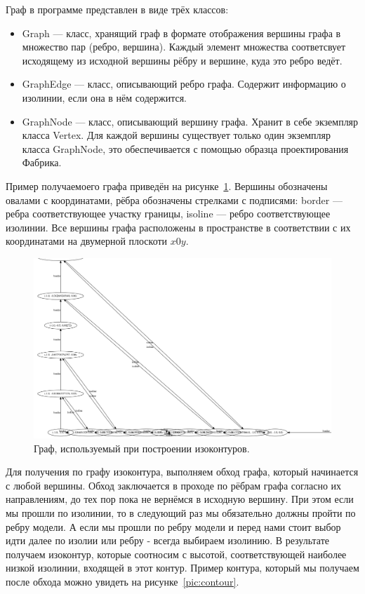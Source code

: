 \documentclass[12pt,a4paper,oneside]{extarticle}
\begin{document}
        Граф в программе представлен в виде трёх классов:
        \begin{itemize}
            \item Graph --- класс, хранящий граф в формате отображения вершины графа в множество пар (ребро, вершина). Каждый элемент множества соответсвует исходящему из исходной вершины рёбру и вершине, куда это ребро ведёт.
            \item GraphEdge --- класс, описывающий ребро графа. Содержит информацию о изолинии, если она в нём содержится.
            \item GraphNode --- класс, описывающий вершину графа. Хранит в себе экземпляр класса Vertex. Для каждой вершины существует только один экземпляр класса GraphNode, это обеспечивается с помощью образца проектирования Фабрика.
        \end{itemize}

        Пример получаемоего графа приведён на рисунке~\ref{pic:graph}. Вершины обозначены овалами с координатами, рёбра обозначены стрелками с подписями: border --- ребра соответствующее участку границы, isoline --- ребро соответствующее изолинии. Все вершины графа расположены в пространстве в соответствии с их координатами на двумерной плоскоти $x0y$.

        \begin{figure}[h!]
            \center
            \includegraphics[scale=0.3]{graph.png}
            \caption{Граф, используемый при построении изоконтуров.}
            \label{pic:graph}
        \end{figure}

        Для получения по графу изоконтура, выполняем обход графа, который начинается с любой вершины. Обход заключается в проходе по рёбрам графа согласно их направлениям, до тех пор пока не вернёмся в исходную вершину. При этом если мы прошли по изолинии, то в следующий раз мы обязательно должны пройти по ребру модели. А если мы прошли по ребру модели и перед нами стоит выбор идти далее по изолии или ребру - всегда выбираем изолинию. В результате получаем изоконтур, которые соотносим с высотой, соответствующей наиболее низкой изолинии, входящей в этот контур. Пример контура, который мы получаем после обхода можно увидеть на рисунке~\ref{pic:contour}.
\end{document}
